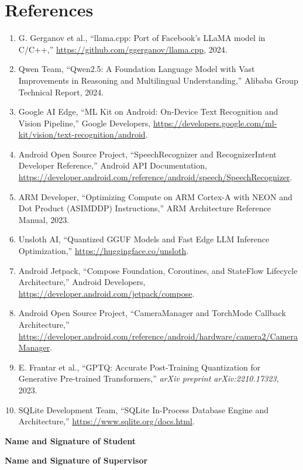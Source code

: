 \documentclass[11pt]{article}
\begin{document}
\section{References}
\begin{enumerate}[leftmargin=1.8em, itemsep=1pt]
    \item G. Gerganov et al., ``llama.cpp: Port of Facebook's LLaMA model in C/C++,'' \url{https://github.com/ggerganov/llama.cpp}, 2024.
    \item Qwen Team, ``Qwen2.5: A Foundation Language Model with Vast Improvements in Reasoning and Multilingual Understanding,'' Alibaba Group Technical Report, 2024.
    \item Google AI Edge, ``ML Kit on Android: On-Device Text Recognition and Vision Pipeline,'' Google Developers, \url{https://developers.google.com/ml-kit/vision/text-recognition/android}.
    \item Android Open Source Project, ``SpeechRecognizer and RecognizerIntent Developer Reference,'' Android API Documentation, \url{https://developer.android.com/reference/android/speech/SpeechRecognizer}.
    \item ARM Developer, ``Optimizing Compute on ARM Cortex-A with NEON and Dot Product (ASIMDDP) Instructions,'' ARM Architecture Reference Manual, 2023.
    \item Unsloth AI, ``Quantized GGUF Models and Fast Edge LLM Inference Optimization,'' \url{https://huggingface.co/unsloth}.
    \item Android Jetpack, ``Compose Foundation, Coroutines, and StateFlow Lifecycle Architecture,'' Android Developers, \url{https://developer.android.com/jetpack/compose}.
    \item Android Open Source Project, ``CameraManager and TorchMode Callback Architecture,'' \url{https://developer.android.com/reference/android/hardware/camera2/CameraManager}.
    \item E. Frantar et al., ``GPTQ: Accurate Post-Training Quantization for Generative Pre-trained Transformers,'' \textit{arXiv preprint arXiv:2210.17323}, 2023.
    \item SQLite Development Team, ``SQLite In-Process Database Engine and Architecture,'' \url{https://www.sqlite.org/docs.html}.
\end{enumerate}

\vspace{2.5em}
\noindent

\begin{minipage}{0.5\textwidth}
    \textbf{Name and Signature of Student}
\end{minipage}%
\begin{minipage}{0.5\textwidth}
    \raggedleft
    \textbf{Name and Signature of Supervisor}
\end{minipage}
\end{document}
